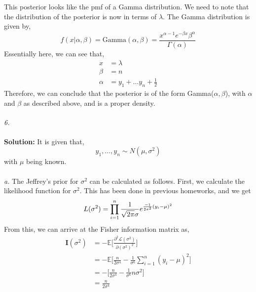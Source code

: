 \documentclass[11pt]{article}
\begin{document}
This posterior looks like the pmf of a Gamma distribution. We need to note that the distribution of the posterior is now in terms of $\lambda$. The Gamma distribution is given by,
\begin{equation}
  \nonumber
  f(x | \alpha, \beta) = \text{Gamma}(\alpha, \beta) = \frac{x^{\alpha - 1}e^{-\beta x} \beta^{\alpha}}{\Gamma(\alpha)}
\end{equation}
Essentially here, we can see that,
\begin{equation}
  \nonumber
  \begin{aligned}
    x & = \lambda\\
    \beta & = n\\
    \alpha & = y_{1} + \dots y_{n} + \frac{1}{2}
  \end{aligned}
\end{equation}
Therefore, we can conclude that the posterior is of the form Gamma($\alpha, \beta$), with $\alpha$ and $\beta$ as described above, and is a proper density.\\ \\
\emph{6.}\\ \\
\textbf{Solution:} It is given that,
\begin{equation}
  \nonumber
  y_{1},\dots,y_{n} \sim N(\mu, \sigma^{2})
\end{equation}
with $\mu$ being known.\\ \\
\emph{a.} The Jeffrey's prior for $\sigma^{2}$ can be calculated as follows. First, we calculate the likelihood function for $\sigma^{2}$. This has been done in previous homeworks, and we get
\begin{equation}
  \nonumber
  L(\sigma^{2}) = \prod_{i = 1}^{n} \frac{1}{\sqrt{2\pi}\sigma}e^{\frac{-1}{2\sigma^{2}} (y_{i} - \mu)^{2}}\\
\end{equation}
From this, we can arrive at the Fisher information matrix as,
\begin{equation}
  \nonumber
  \begin{aligned}
    \mathbf{I}(\sigma^{2}) & = -\mathbb{E}\bigg[\frac{\partial^{2} \mathcal{L}(\sigma^2)}{\partial (\sigma^{2})^{2}}\bigg]\\
    & = -\mathbb{E}\bigg[\frac{n}{2 \sigma^{4}} - \frac{1}{\sigma^{6}} \sum_{i = 1}^{n}(y_{i} - \mu)^{2}\bigg]\\
    & = -\bigg[\frac{n}{2 \sigma^{4}} - \frac{1}{\sigma^{6}} n\sigma^{2}\bigg]\\
    & = \frac{n}{2\sigma^{4}}
  \end{aligned}
\end{equation}
\end{document}
